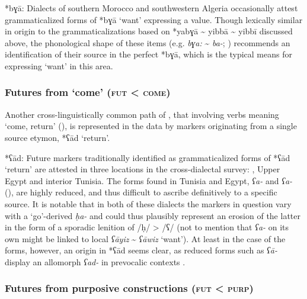 \documentclass[output=paper]{langsci/langscibook}
\begin{document}
\begin{altdescription}
\item[*{bɣā}:]
Dialects of southern Morocco and southwestern Algeria occasionally attest grammaticalized forms of *{bɣā} ‘want’ expressing a   value. Though lexically similar in origin to the grammaticalizations based on *yabɣā {\textasciitilde} yibbā {\textasciitilde} yibbī discussed above, the phonological shape of these items (e.g.  \textit{bɣa:} {\textasciitilde} \textit{ba-}; \citealt{Sánchez2014}) recommends an identification of their source in the perfect  *bɣā, which is the typical means for expressing ‘want’ in this area.
\end{altdescription}

\subsubsection{Futures from ‘come’ (\textsc{fut} < \textsc{come})}

Another cross-linguistically common path of   , that involving verbs meaning ‘come, return’ (\citealt{Bybee1994,HeineKuteva2002}), is represented in the  data by markers originating from a single source etymon, *{ʕād} ‘return’.

\begin{altdescription}
\item[*{ʕād}:]
Future  markers traditionally identified as grammaticalized forms of *{ʕād} ‘return’ are attested in three locations in the cross-dialectal survey: , Upper Egypt and interior Tunisia. The forms found in Tunisia and Egypt,  \textit{ʕa-} and  \textit{ʕa-} (\citealt{Saada1984,Schroepfer2019}), are highly reduced, and thus difficult to ascribe definitively to a specific source. It is notable that in both of these dialects the markers in question vary with a ‘go’-derived  \textit{ḥa-} and could thus plausibly represent an erosion of the latter in the form of a sporadic lenition of /ḥ/ > /ʕ/ (not to mention that  \textit{ʕa-} on its own might be linked to local \textit{ʕāyiz} {\textasciitilde} \textit{ʕāwiz} ‘want’). At least in the case of the  forms, however, an origin in *{ʕād} seems clear, as reduced forms such as  \textit{ʕā-} display an allomorph \textit{ʕad-} in prevocalic contexts \citep{Watson1993}.
\end{altdescription}

\subsubsection{Futures from purposive constructions (\textsc{fut} < \textsc{purp})}
\end{document}
